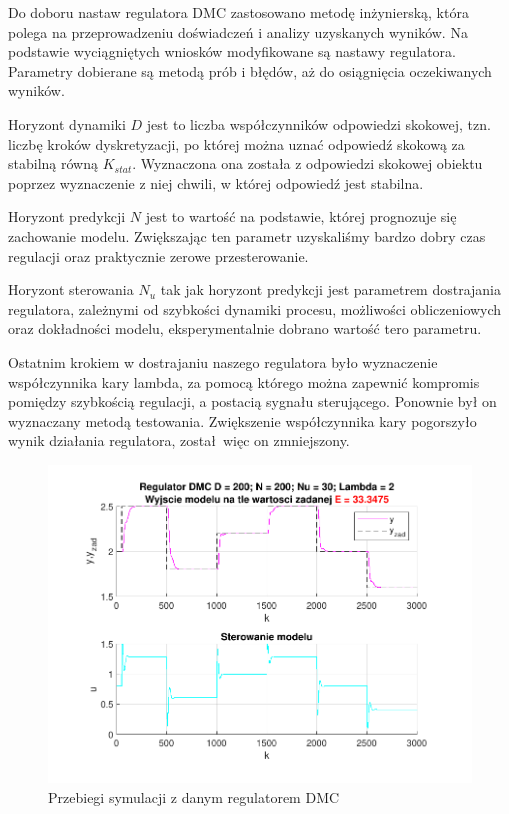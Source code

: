 Do doboru nastaw regulatora DMC zastosowano metodę inżynierską, 
która polega na przeprowadzeniu doświadczeń i analizy uzyskanych wyników. 
Na podstawie wyciągniętych wniosków modyfikowane są nastawy regulatora. 
Parametry  dobierane są metodą prób i błędów, aż do osiągnięcia oczekiwanych wyników.

\indent Horyzont dynamiki $D$ jest to liczba współczynników odpowiedzi skokowej, 
tzn. liczbę kroków dyskretyzacji, po której można uznać odpowiedź skokową za stabilną równą $K_{stat}$. 
Wyznaczona ona została z odpowiedzi skokowej obiektu poprzez wyznaczenie z niej chwili, 
w której odpowiedź jest stabilna.

\indent Horyzont predykcji $N$ jest to wartość na podstawie, 
której prognozuje się zachowanie modelu. 
Zwiększając ten parametr uzyskaliśmy bardzo dobry czas regulacji oraz praktycznie zerowe przesterowanie.

\indent Horyzont sterowania $N_{u}$ tak jak horyzont predykcji jest parametrem dostrajania regulatora, 
zależnymi od szybkości dynamiki procesu, możliwości obliczeniowych oraz dokładności modelu, 
eksperymentalnie dobrano wartość tero parametru.

Ostatnim krokiem w dostrajaniu naszego regulatora było wyznaczenie współczynnika kary lambda, 
za pomocą którego można zapewnić kompromis pomiędzy szybkością regulacji, a postacią sygnału sterującego. 
Ponownie był on wyznaczany metodą testowania. 
Zwiększenie współczynnika kary pogorszyło wynik działania regulatora, został więc on zmniejszony.


\begin{figure}[H]
    \centering
    \includegraphics[scale=0.90]{../projekt/zad4_5/DMC_pdf/DMC_1.pdf}
    \caption{Przebiegi symulacji z danym regulatorem DMC}
\end{figure}

